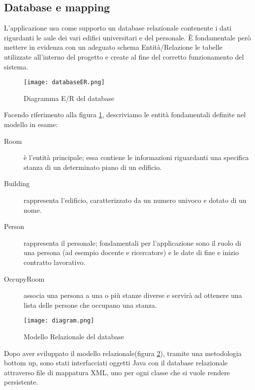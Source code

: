 \FloatBarrier
\subsection{Database e mapping}

L'applicazione usa come supporto un database relazionale contenente i dati rigurdanti le aule dei vari edifici universitari e del personale.
\`E fondamentale però mettere in evidenza con un adeguato schema Entità/Relazione le tabelle utilizzate all’interno del progetto e create al fine del corretto funzionamento del 
sistema.

\begin{figure}[!htb]
\centering
\texttt{[image: databaseER.png]}
\caption{Diagramma E/R del database}\label{fig:database}
\end{figure}

Facendo riferimento alla figura \ref{fig:database}, descriviamo le entità fondamentali definite nel modello in esame:
\FloatBarrier
\begin{description}
\item[Room]\`e l'entit\`a principale; essa contiene le informazioni riguardanti una specifica stanza di un determinato piano di un edificio. 
\item[Building]rappresenta l'edificio, caratterizzato da un numero univoco e dotato di un nome.
\item[Person]rappresenta il personale; fondamentali per l'applicazione sono il ruolo di una persona (ad esempio docente e ricercatore) e le date di fine e inizio contratto lavorativo.
\item[OccupyRoom]associa una persona a una o pi\`u stanze diverse e  servir\`a ad ottenere una lista delle persone che occupano una stanza.
\end{description}

\FloatBarrier
\begin{figure}[!htb]
\centering
\texttt{[image: diagram.png]}
\caption{Modello Relazionale del database}\label{fig:databaseRelaz}
\end{figure}
\FloatBarrier
Dopo aver sviluppato il modello relazionale(figura \ref{fig:databaseRelaz}), tramite una metodologia bottom up, sono stati interfacciati oggetti Java con il database relazionale attraverso file di mappatura XML, uno per ogni classe che si vuole rendere persistente.\\ 

